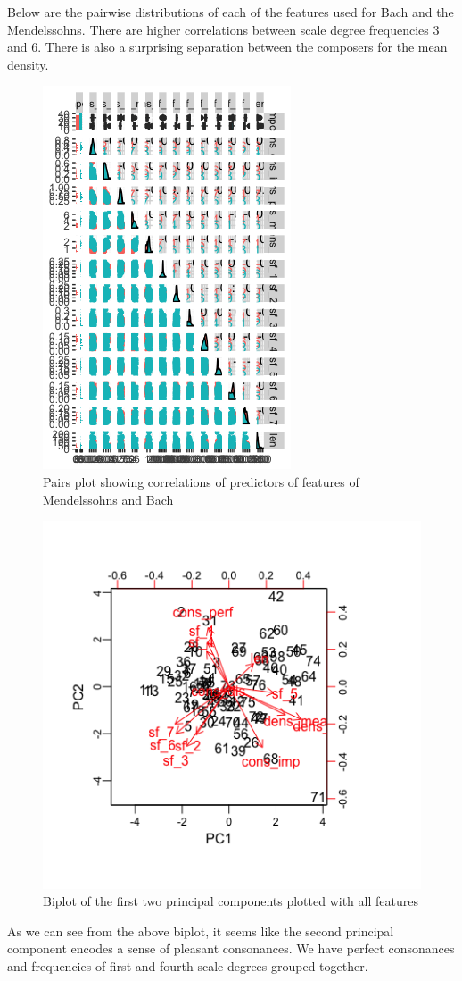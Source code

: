 \documentclass[12pt,twoside]{reedthesis}
\theoremstyle{definition}
\theoremstyle{definition}
\theoremstyle{definition}
\theoremstyle{remark}
\begin{document}
Below are the pairwise distributions of each of the features used for
Bach and the Mendelssohns. There are higher correlations between scale
degree frequencies 3 and 6. There is also a surprising separation
between the composers for the mean density.
\begin{figure}[h]
\centering
\includegraphics[scale = .5]{images/Couplet.png}
\caption{Pairs plot showing correlations of predictors of features of Mendelssohns and Bach}
\label{subd}
\end{figure}
\begin{figure}[h]
\centering
\includegraphics[scale = .5]{images/PCA_bach.png}
\caption{Biplot of the first two principal components plotted with all features}
\label{subd}
\end{figure}
As we can see from the above biplot, it seems like the second principal
component encodes a sense of pleasant consonances. We have perfect
consonances and frequencies of first and fourth scale degrees grouped
together.
\end{document}
